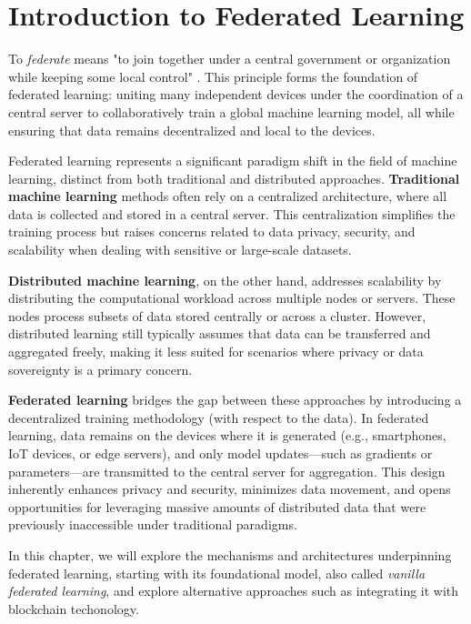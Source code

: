 
\clearpage


\clearpage

\section{Introduction to Federated Learning}
To \textit{federate} means "to join together under a central government or organization while keeping some
local control" \cite{oxford_federate}.
This principle forms the foundation of federated learning: uniting many independent devices under the
coordination of a central server to collaboratively train a global machine learning model, all while ensuring
that data remains decentralized and local to the devices.

Federated learning represents a significant paradigm shift in the field of machine learning, distinct from
both traditional and distributed approaches.
\textbf{Traditional machine learning} methods often rely on a centralized architecture, where all data is
collected and stored in a central server. This centralization simplifies the training process but raises
concerns related to data privacy, security, and scalability when dealing with sensitive or large-scale datasets.

\textbf{Distributed machine learning}, on the other hand, addresses scalability by distributing the
computational workload across multiple nodes or servers. These nodes process subsets of data stored centrally
or across a cluster. However, distributed learning still typically assumes that data can be transferred and
aggregated freely, making it less suited for scenarios where privacy or data sovereignty is a primary concern.

\textbf{Federated learning} bridges the gap between these approaches by introducing a decentralized training
methodology (with respect to the data). In federated learning, data remains on the devices where it is
generated (e.g., smartphones, IoT
devices, or edge servers), and only model updates—such as gradients or parameters—are transmitted to the
central server for aggregation. This design inherently enhances privacy and security, minimizes data
movement, and opens opportunities for leveraging massive amounts of distributed data that were previously
inaccessible under traditional paradigms.

In this chapter, we will explore the mechanisms and architectures underpinning federated learning, starting
with its foundational model, also called \textit{vanilla federated learning}, and explore alternative
approaches such as integrating it with blockchain techonology.


